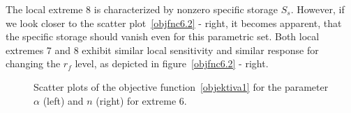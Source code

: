 \documentclass[review]{elsarticle}
\begin{document}
The local extreme 8 is characterized by nonzero specific storage $S_s$. However, if we look closer to the scatter plot~\ref{objfnc6.2} - right, it becomes apparent, that the specific storage should vanish even for this parametric set. Both local extremes 7 and 8 exhibit similar local sensitivity and similar response for changing the $r_f$ level, as depicted in figure~\ref{objfnc6.2} - right.




\begin{figure}
\label{objfnc6}
\caption{Scatter plots of the objective function~\eqref{objektiva1} for the parameter $\alpha$ (left) and $n$ (right) for extreme 6.}
\end{figure}
\end{document}
